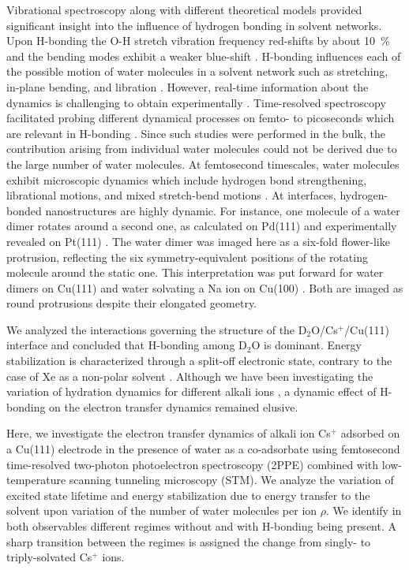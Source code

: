 \documentclass[aps,twocolumn,amssymb,amsfonts,amsmath,showpacs,final,a4paper,superscriptaddress]{revtex4-2}
\begin{document}
Vibrational spectroscopy along with different theoretical models provided significant insight into the influence of hydrogen bonding in solvent networks. Upon H-bonding the O-H stretch vibration frequency red-shifts by about 10~\% and the bending modes exhibit a weaker blue-shift \cite{Nibbering_2007}. H-bonding influences each of the possible motion of water molecules in a solvent network such as stretching, in-plane bending, and libration \cite{Cowan_2005}. However, real-time information about the dynamics is challenging to obtain experimentally \cite{Yang_2021}. Time-resolved spectroscopy facilitated probing different dynamical processes on femto- to picoseconds which are relevant in H-bonding \cite{Nome_2010}. Since such studies were performed in the bulk, the contribution arising from individual water molecules could not be derived due to the large number of water molecules. At femtosecond timescales, water molecules exhibit microscopic dynamics which include hydrogen bond strengthening, librational motions, and mixed stretch-bend motions \cite{Yang_2021, Cowan_2005, Ramasesha_2013}. At interfaces, hydrogen-bonded nanostructures are highly dynamic. For instance, one molecule of a water dimer rotates around a second one, as calculated on Pd(111) \cite{Ranea_2004} and experimentally revealed on Pt(111) \cite{Motobayashi_2008}. The water dimer was imaged here as a six-fold flower-like protrusion, reflecting the six symmetry-equivalent positions of the rotating molecule around the static one. This interpretation was put forward for water dimers on Cu(111) \cite{Bertram_2019} and water solvating a Na ion on Cu(100) \cite{Shiotari_2018}. Both are imaged as round protrusions despite their elongated geometry.


We analyzed the interactions governing the structure of the D$_2$O/Cs$^+$/Cu(111) interface  \cite{penschke_2023} and concluded that H-bonding among D$_2$O is dominant. Energy stabilization is characterized through a split-off electronic state, contrary to the case of Xe as a non-polar solvent \cite{thomas_2021}. Although we have been investigating the variation of hydration dynamics for different alkali ions \cite{meyer_2015}, a dynamic effect of H-bonding on the electron transfer dynamics remained elusive.

Here, we investigate the electron transfer dynamics of alkali ion Cs$^+$ adsorbed on a Cu(111) electrode in the presence of water as a co-adsorbate using femtosecond time-resolved two-photon photoelectron spectroscopy (2PPE) combined with low-temperature scanning tunneling microscopy (STM). We analyze the variation of excited state lifetime and energy stabilization due to energy transfer to the solvent upon variation of the number of water molecules per ion $\rho$. We identify in both observables different regimes without and with H-bonding being present. A sharp transition between the regimes is assigned the change from singly- to triply-solvated Cs$^+$ ions.
\end{document}
